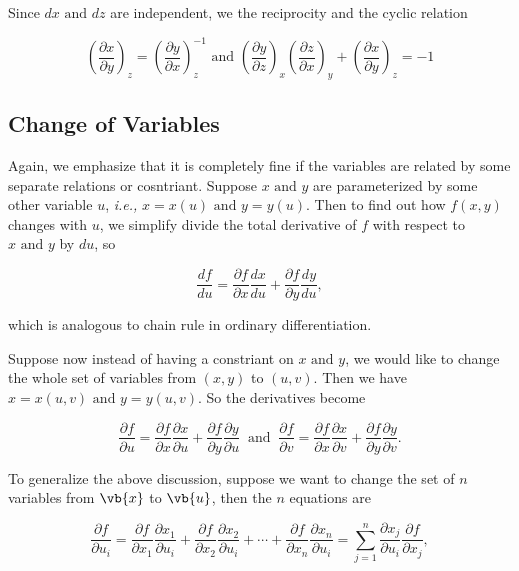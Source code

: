 \documentclass[english,a4paper,12pt]{report}
\begin{document}
Since \(dx \text { and }  dz\) are independent, we the reciprocity and the cyclic relation 

\begin{equation}
    \left( \frac{\partial x}{\partial y}  \right)_{z} = \left( \frac{\partial y}{\partial x}  \right)_{z}^{-1} \text { and } \left( \frac{\partial y}{\partial z}  \right)_{x} \left( \frac{\partial z}{\partial x}  \right)_{y} + \left( \frac{\partial x}{\partial y}  \right)_{z} = -1 
\end{equation}

\subsection{Change of Variables}

Again, we emphasize that it is completely fine if the variables are related by some separate relations or cosntriant. Suppose \(x \text { and } y\) are parameterized by some other variable \(u\), \textit{i.e.,} \(x = x(u) \text { and } y = y(u)\). Then to find out how \(f(x,y)\) changes with \(u\), we simplify divide the total derivative of \(f\) with respect to \(x \text { and } y\) by \(du\), so

\begin{equation}
    \frac{df}{du} = \frac{\partial f}{\partial x} \frac{dx}{du} + \frac{\partial f}{\partial y} \frac{dy}{du},
\end{equation}

which is analogous to chain rule in ordinary differentiation.

Suppose now instead of having a constriant on \(x\text { and } y\), we would like to change the whole set of variables from \((x,y)\) to \((u,v)\). Then we have \(x = x(u,v) \text { and } y = y(u,v)\). So the derivatives become

\begin{equation} \label{changeofvar} 
    \frac{\partial f}{\partial u} = \frac{\partial f}{\partial x} \frac{\partial x}{\partial u} + \frac{\partial f}{\partial y} \frac{\partial y}{\partial u} ~\text { and }~ \frac{\partial f}{\partial v} = \frac{\partial f}{\partial x} \frac{\partial x}{\partial v} + \frac{\partial f}{\partial y} \frac{\partial y}{\partial v}.  
\end{equation}

To generalize the above discussion, suppose we want to change the set of \(n\) variables from \(\vb{x}\) to \(\vb{u} \), then the \(n\) equations are 

\begin{equation}
	\frac{\partial f}{\partial u_{i} } = \frac{\partial f}{\partial x_1 }\frac{\partial x_1}{\partial u_{i} } + \frac{\partial f}{\partial x_2 }\frac{\partial x_2 }{\partial u_{i} } + \cdots + \frac{\partial f}{\partial x_{n} }\frac{\partial x_{n} }{\partial u_{i} } = \sum_{j=1}^{n} \frac{\partial x_{j} }{\partial u_{i} }\frac{\partial f}{\partial x_{j} },
\end{equation}
\end{document}
